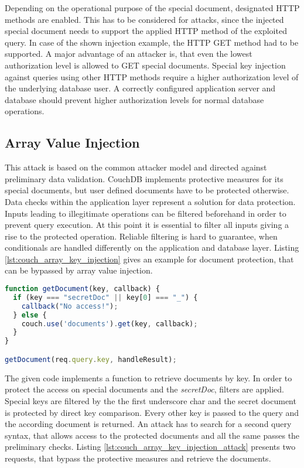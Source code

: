 Depending on the operational purpose of the special document, designated HTTP methods are enabled. This has to be considered for attacks, since the injected special document needs to support the applied HTTP method of the exploited query. In case of the shown injection example, the HTTP GET method had to be supported. A major advantage of an attacker is, that even the lowest authorization level is allowed to GET special documents. Special key injection against queries using other HTTP methods require a higher authorization level of the underlying database user. A correctly configured application server and database should prevent higher authorization levels for normal database operations. \\

\subsection{Array Value Injection}
This attack is based on the common attacker model and directed against preliminary data validation. CouchDB implements protective measures for its special documents, but user defined documents have to be protected otherwise. Data checks within the application layer represent a solution for data protection. Inputs leading to illegitimate operations can be filtered beforehand in order to prevent query execution. At this point it is essential to filter all inputs giving a rise to the protected operation. Reliable filtering is hard to guarantee, when conditionals are handled differently on the application and database layer. Listing \ref{lst:couch_array_key_injection} gives an example for document protection, that can be bypassed by array value injection.\\

\begin{lstlisting}[caption={Vulnerable NodeJS example for array key injection on CouchDB}, label={lst:couch_array_key_injection}, language=JavaScript]
function getDocument(key, callback) {
  if (key === "secretDoc" || key[0] === "_") {
    callback("No access!");
  } else {
    couch.use('documents').get(key, callback);
  }
}

getDocument(req.query.key, handleResult);
\end{lstlisting}

The given code implements a function to retrieve documents by key. In order to protect the access on special documents and the \emph{secretDoc}, filters are applied. Special keys are filtered by the the first underscore char and the secret document is protected by direct key comparison. Every other key is passed to the query and the according document is returned. An attack has to search for a second query syntax, that allows access to the protected documents and all the same passes the preliminary checks. Listing \ref{lst:couch_array_key_injection_attack} presents two requests, that bypass the protective measures and retrieve the documents. \\

